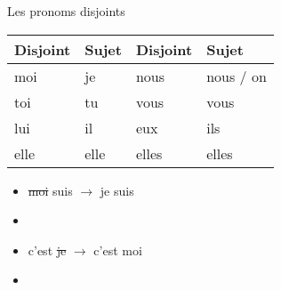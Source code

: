 \begin{frame}{Les pronoms disjoints}
  \begin{center}
    \begin{tabular}{l l | l l}
      Disjoint     & Sujet  & Disjoint      & Sujet \\
      \hline
      \alert{moi}  & je     & \alert{nous}  & nous / on \\
      \alert{toi}  & tu     & \alert{vous}  & vous \\
      \alert{lui}  & il     & \alert{eux}   & ils \\
      \alert{elle} & elle   & \alert{elles} & elles \\
    \end{tabular}
  \end{center}
  \begin{itemize}
    \item \sout{moi} suis $\to$ \alert{je} suis
    \item[] 
    \item c'est \sout{je} $\to$ c'est \alert{moi}
    \item[] 
  \end{itemize}
\end{frame}